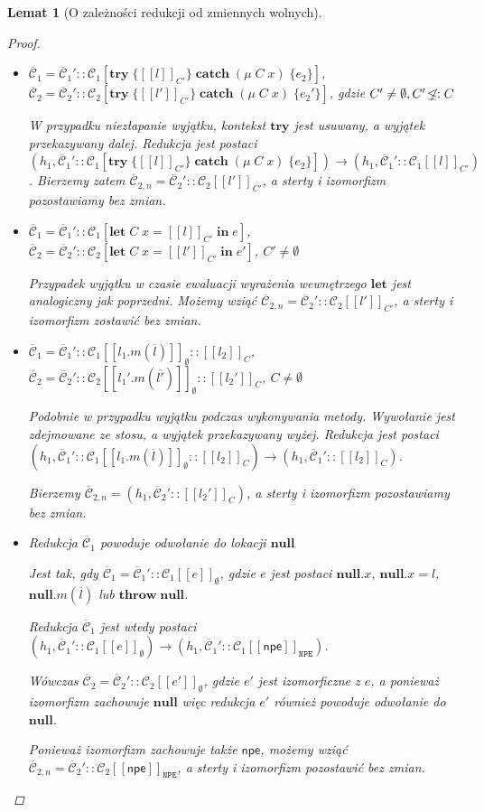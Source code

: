 \documentclass[]{pracamgr}
\renewcommand \| {\hspace{0.75em} | \hspace{0.75em} }
\renewcommand \[ {[\![}
\renewcommand \] {]\!]}
\newtheorem{lemma}{Lemat}
\theoremstyle{definition}
\newcommand{\mmod}{\mu\xspace}
\newcommand{\jlet}{\mathbf{let}\xspace}
\newcommand{\jin}{\mathbf{in}\xspace}
\newcommand{\jthrow}{\mathbf{throw}\xspace}
\newcommand{\jtry}{\mathbf{try}\xspace}
\newcommand{\jcatch}{\mathbf{catch}\xspace}
\newcommand{\jnull}{\mathbf{null}\xspace}
\newcommand{\letin}[4]{\jlet\; #1\; #2 = #3\; \jin\; #4\xspace}
\newcommand{\throwin}[1]{\jthrow\; #1\xspace}
\newcommand{\tcatch}[4]{\jtry\; \boldsymbol{\{}#1\boldsymbol{\}}\; \jcatch\; (#2\; #3)\; \boldsymbol{\{}#4\boldsymbol{\}}\xspace}
\newcommand{\ctxt}{\mathcal{C}\xspace}
\newcommand{\ctxts}{\overline{\ctxt}}
\newcommand{\npetype}{\texttt{NPE}\xspace}
\newcommand{\npe}{\mathsf{npe}\xspace}
\begin{document}
\begin{lemma}[O zależności redukcji od zmiennych wolnych]{\ }
\begin{proof}
\begin{itemize}
\item $\ctxts_1 = \ctxts_1'::\ctxt_1[\tcatch{\[ l\] _{C'}}{\mmod\; C}{x}{e_2}]$, \;\;
      $\ctxts_2 = \ctxts_2'::\ctxt_2[\tcatch{\[ l'\] _{C'}}{\mmod\; C}{x}{e_2'}]$, \;\;
      gdzie $C'\not=\emptyset, C' \not\!\leq:  C $  

W przypadku niezłapanie wyjątku, kontekst $\jtry$ jest usuwany, a wyjątek przekazywany dalej.
Redukcja jest postaci
$(h_1, \ctxts_1'::\ctxt_1[\tcatch{\[ l\] _{C'}}{\mmod\; C}{x}{e_2}]) \rightarrow
 (h_1, \ctxts_1'::\ctxt_1\[ l\] _{C'})$.
Bierzemy zatem $\ctxts_{2,n} = \ctxts_2'::\ctxt_2\[ l'\] _{C'}$,
a sterty i izomorfizm pozostawiamy bez zmian.
 
\item $\ctxts_1 = \ctxts_1'::\ctxt_1[\letin{C}{x}{\[ l\] _{C'}}{e}]$, \;\;
      $\ctxts_2 = \ctxts_2'::\ctxt_2[\letin{C}{x}{\[ l'\] _{C'}}{e'}]$, \;\;
      $C' \neq \emptyset$
      
Przypadek wyjątku w czasie ewaluacji wyrażenia wewnętrzego $\jlet$ jest analogiczny jak
poprzedni. Możemy wziąć $\ctxts_{2,n} = \ctxts_2'::\ctxt_2\[ l'\] _{C'}$,
a sterty i izomorfizm zostawić bez zmian.
      
\item $\ctxts_1 = \ctxts_1'::\ctxt_1\[ l_1.m(\overline{l})\]_\emptyset::\[l_2\]_C$, \;\;
      $\ctxts_2 = \ctxts_2'::\ctxt_2\[ l_1'.m(\overline{l'})\]_\emptyset::\[l_2'\]_C$, \;\;
      $C\not=\emptyset$  
      
Podobnie w przypadku wyjątku podczas wykonywania metody. Wywołanie jest zdejmowane ze stosu,
a wyjątek przekazywany wyżej. Redukcja jest postaci
$(h_1, \ctxts_1'::\ctxt_1\[ l_1.m(\overline{l})\]_\emptyset::\[l_2\]_C) \rightarrow
 (h_1, \ctxts_1'::\[l_2\]_C)$.
 
Bierzemy $\ctxts_{2,n} = (h_1, \ctxts_2'::\[l_2'\]_C)$, a sterty i izomorfizm pozostawiamy bez zmian.

 
\item Redukcja $\ctxts_1$ powoduje odwołanie do lokacji $\jnull$

Jest tak, gdy $\ctxts_1 = \ctxts_1'::\ctxt_1\[e\]_\emptyset$, gdzie
$e$ jest postaci  $\jnull.x$, $\jnull.x = l$, $\jnull.m( \overline{l})$ lub
$\throwin{\jnull}$.
 
Redukcja $\ctxts_1$ jest wtedy postaci
$(h_1, \ctxts_1':: \ctxt_1 \[ e \]_\emptyset) \rightarrow
 (h_1, \ctxts_1':: \ctxt_1 \[ \npe\]_\npetype)$.
 
Wówczas $\ctxts_2 = \ctxts_2'::\ctxt_2 \[ e' \]_\emptyset$, gdzie $e'$ jest izomorficzne z $e$,
a ponieważ izomorfizm zachowuje $\jnull$ więc redukcja $e'$ również powoduje
odwołanie do $\jnull$.

Ponieważ izomorfizm zachowuje także $\npe$, możemy wziąć
$\ctxts_{2,n} = \ctxts_2'::\ctxt_2 \[ \npe \]_\npetype$,
a sterty i izomorfizm pozostawić bez zmian.
\end{itemize}
\end{proof}
\end{lemma}
\end{document}
